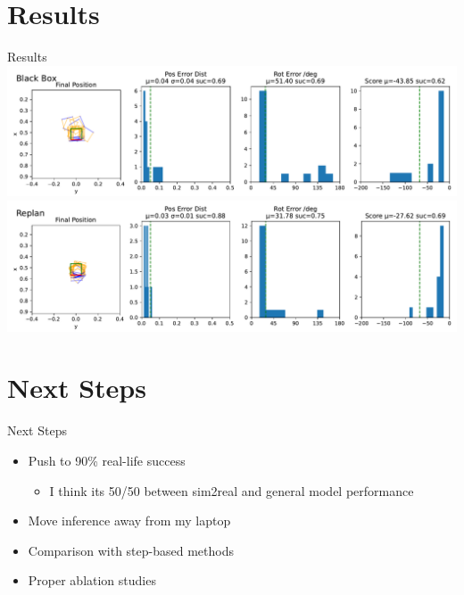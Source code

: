 \documentclass[16:9,en,navbarinfooter]{sdqbeamer}
\begin{document}
\section{Results}
\begin{frame}{Results}
\center
    \includegraphics[width=.7\linewidth]{media/blackbox_presentation.pdf}\\
    \includegraphics[width=.7\linewidth]{media/replan_presentation.pdf}
\end{frame}

\section{Next Steps}
\begin{frame}{Next Steps}

    \begin{itemize}
        \item Push to 90\% real-life success 
        \begin{itemize}
                \item I think its 50/50 between sim2real and general model performance
        \end{itemize}
        \item Move inference away from my laptop 
        \item Comparison with step-based methods
        \item Proper ablation studies
    \end{itemize}
\end{frame}
\end{document}
